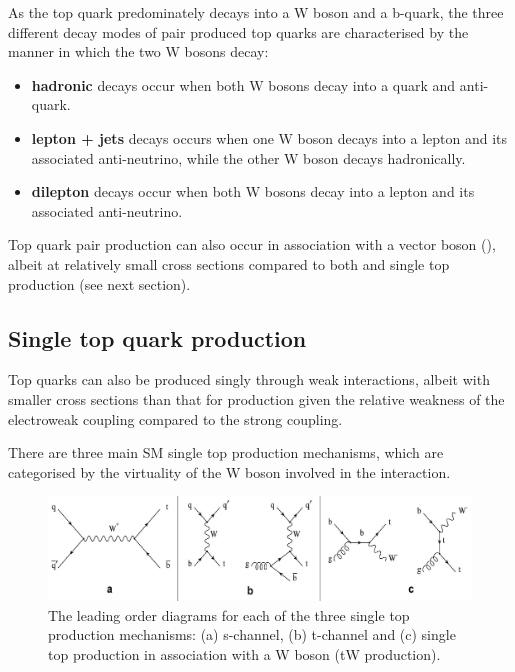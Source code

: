 As the top quark predominately decays into a W boson and a b-quark, the three different decay modes of pair produced top quarks are characterised by the manner in which the two W bosons decay:
\begin{itemize}
\item \textbf{hadronic} decays occur when both W bosons decay into a quark and anti-quark.
\item \textbf{lepton + jets} decays occurs when one W boson decays into a lepton and its associated anti-neutrino, while the other W boson decays hadronically.
\item \textbf{dilepton} decays occur when both W bosons decay into a lepton and its associated anti-neutrino.
\end{itemize}
 

Top quark pair production can also occur in association with a vector boson (\ttV), albeit at relatively small cross sections compared to both \ttbar and single top production (see next section).

\subsection{Single top quark production}\label{subsec:singleTopTheory}
Top quarks can also be produced singly through weak interactions, albeit with smaller cross sections than that for \ttbar production given the relative weakness of the electroweak coupling compared to the strong coupling.

There are three main SM single top production mechanisms, which are categorised by the virtuality of the W boson involved in the interaction.

\begin{figure}[htbp]
\centering
\includegraphics[width=1.00\textwidth]{figs/top-physics/singletop_feyn.jpg}
\caption{The leading order diagrams for each of the three single top production mechanisms: (a) s-channel, (b) t-channel and (c) single top production in association with a W boson (tW production).}
\label{fig:singleTopDiagrams}
\end{figure}

